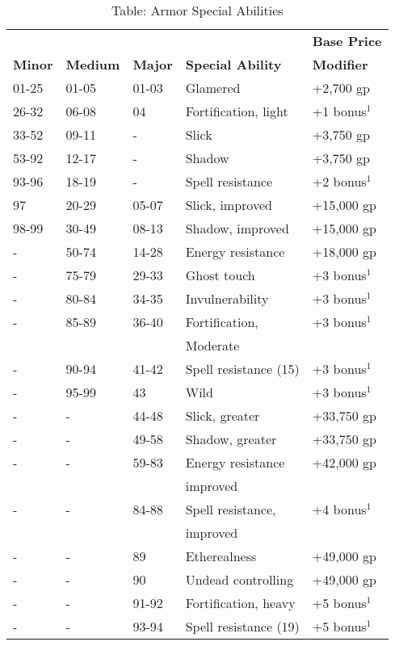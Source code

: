 \begin{table}[]
\sffamily
\caption{Table: Armor Special Abilities}
\setlength{\tabcolsep}{1pt}
\begin{tabularx}{\linewidth}{lllXl}
               &                 &                &                          & \textbf{Base Price} \\
\textbf{Minor} & \textbf{Medium} & \textbf{Major} & \textbf{Special Ability} & \textbf{Modifier}\\
01-25 & 01-05 & 01-03 & Glamered & +2,700 gp\\
26-32 & 06-08 & 04 & Fortification, light & +1 bonus\(^{1}\)\\
33-52 & 09-11 & - & Slick & +3,750 gp\\
53-92 & 12-17 & - & Shadow & +3,750 gp\\
93-96 & 18-19 & - & Spell resistance & +2 bonus\(^{1}\)\\
97 & 20-29 & 05-07 & Slick, improved & +15,000 gp\\
98-99 & 30-49 & 08-13 & Shadow, improved & +15,000 gp\\
- & 50-74 & 14-28 & Energy resistance & +18,000 gp\\
- & 75-79 & 29-33 & Ghost touch & +3 bonus\(^{1}\)\\
- & 80-84 & 34-35 & Invulnerability & +3 bonus\(^{1}\)\\
- & 85-89 & 36-40 & Fortification, & +3 bonus\(^{1}\)\\
  &       &       & Moderate & \\
- & 90-94 & 41-42 & Spell resistance (15) & +3 bonus\(^{1}\)\\
- & 95-99 & 43 & Wild & +3 bonus\(^{1}\)\\
- & - & 44-48 & Slick, greater & +33,750 gp\\
- & - & 49-58 & Shadow, greater & +33,750 gp\\
- & - & 59-83 & Energy resistance & +42,000 gp \\
  &   &       & improved          & \\
- & - & 84-88 & Spell resistance, & +4 bonus\(^{1}\)\\
  &   &       & improved          & \\
- & - & 89 & Etherealness & +49,000 gp\\
- & - & 90 & Undead controlling & +49,000 gp\\
- & - & 91-92 & Fortification, heavy & +5 bonus\(^{1}\)\\
- & - & 93-94 & Spell resistance (19) & +5 bonus\(^{1}\)\\

\end{tabularx}
\end{table}
